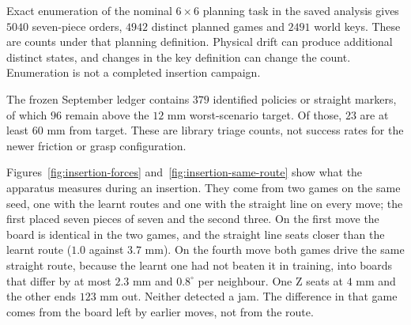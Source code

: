 Exact enumeration of the nominal $6\times6$ planning task in the saved analysis gives $5040$ seven-piece orders, $4942$ distinct planned games and $2491$ world keys. These are counts under that planning definition. Physical drift can produce additional distinct states, and changes in the key definition can change the count. Enumeration is not a completed insertion campaign.

The frozen September ledger contains $379$ identified policies or straight markers, of which $96$ remain above the $12$ mm worst-scenario target. Of those, $23$ are at least $60$ mm from target. These are library triage counts, not success rates for the newer friction or grasp configuration.


Figures~\ref{fig:insertion-forces} and~\ref{fig:insertion-same-route} show what the apparatus measures during an insertion. They come from two games on the same seed, one with the learnt routes and one with the straight line on every move; the first placed seven pieces of seven and the second three. On the first move the board is identical in the two games, and the straight line seats closer than the learnt route ($1.0$ against $3.7$ mm). On the fourth move both games drive the same straight route, because the learnt one had not beaten it in training, into boards that differ by at most $2.3$ mm and $0.8^\circ$ per neighbour. One Z seats at $4$ mm and the other ends $123$ mm out. Neither detected a jam. The difference in that game comes from the board left by earlier moves, not from the route.



